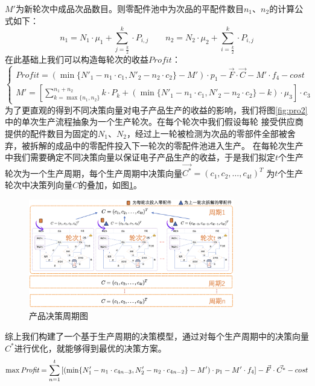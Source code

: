\documentclass[withoutpreface,bwprint]{cumcmthesis} %
\begin{document}
$M'$为新轮次中成品次品数目。则零配件池中为次品的平配件数目$n_{1}$、$n_{2}$的计算公式如下：
\begin{equation}
	n_{1}=N_{1}\cdot \mu_{1}+\sum_{j=\frac{k}{2}}^{k}\cdot P_{i,j} \qquad
	n_{2}=N_{2}\cdot \mu_{2}+\sum_{i=\frac{k}{2}}^{k}\cdot P_{i,j}
\end{equation}
在此基础上我们可以构造每轮次的收益$Profit$：
\begin{equation}
	\left\{\begin{matrix}
		\textit{Profit}=(\min \{N'_{1}-n_{1}\cdot c_{1},N'_{2}-n_{2}\cdot c_{2}\}-M')\cdot p_{1}-\vec{F}\cdot \vec{C}-M'\cdot f_{4}-cost \\
		M'=[\sum_{k=\max \{n_{1},n_{2}\}}^{n_{1}+n_{2}}k\cdot P_{k} + (\min \{N'_{1}-n_{1}\cdot c_{1},N'_{2}-n_{2}\cdot c_{2}\}-k)\cdot \mu_{3}]\cdot c_{3}
	\end{matrix}\right.
	\label{eq:5}
\end{equation}
为了更直观的得到不同决策向量对电子产品生产的收益的影响，我们将图\ref{fig:pro2}中的单次生产流程抽象为一个生产轮次。在每个轮次中我们假设每轮
接受供应商提供的配件数目为固定的$N_{1}$、$N_{2}$，经过上一轮被检测为次品的零部件全部被舍弃，被拆解的成品中的零配件投入下一轮次的零配件池进入生产。
在每轮次生产中我们需要确定不同决策向量以保证电子产品生产的收益，于是我们拟定$t$个生产轮次为一个生产周期，每个生产周期中决策向量$\vec{C^{*}}=(c_{1},c_{2},\dots,c_{4t})^{T}$
为$t$个生产轮次中决策列向量$C$的叠加，如图\ref{fig:pro2-2}。
\begin{figure}[H]
	\centering
	\includegraphics[width=0.8\textwidth]{Fig/pro2-2.png}
	\caption{产品决策周期图}
	\label{fig:pro2-2}
\end{figure}
综上我们构建了一个基于生产周期的决策模型，通过对每个生产周期中的决策向量$C^{*}$进行优化，就能够得到最优的决策方案。
$$	\max \textit{Profit}=\sum_{n=1}^{t}\left [  (\min \{N'_{1}-n_{1}\cdot c_{4n-3},N'_{2}-n_{2}\cdot c_{4n-2}\}-M')\cdot p_{1}-M'\cdot f_{4} \right ] -\vec{F}\cdot \vec{C^{*}} -cost \\$$
\end{document}
